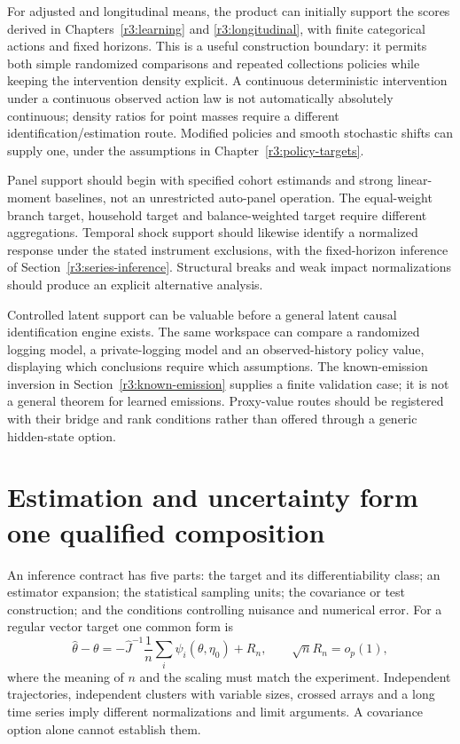 For adjusted and longitudinal means, the product can initially support
the scores derived in Chapters~\ref{r3:learning} and \ref{r3:longitudinal},
with finite categorical actions and fixed horizons. This is a useful
construction boundary: it permits both simple randomized comparisons and
repeated collections policies while keeping the intervention density
explicit. A continuous deterministic intervention under a continuous
observed action law is not automatically absolutely continuous; density
ratios for point masses require a different identification/estimation
route. Modified policies and smooth stochastic shifts can supply one,
under the assumptions in Chapter~\ref{r3:policy-targets}.

Panel support should begin with specified cohort estimands and strong
linear-moment baselines, not an unrestricted auto-panel operation.
The equal-weight branch target, household target and balance-weighted
target require different aggregations. Temporal shock support should
likewise identify a normalized response under the stated instrument
exclusions, with the fixed-horizon inference of
Section~\ref{r3:series-inference}. Structural breaks and weak impact
normalizations should produce an explicit alternative analysis.

Controlled latent support can be valuable before a general latent causal
identification engine exists. The same workspace can compare a randomized
logging model, a private-logging model and an observed-history policy
value, displaying which conclusions require which assumptions. The
known-emission inversion in Section~\ref{r3:known-emission} supplies a
finite validation case; it is not a general theorem for learned emissions.
Proxy-value routes should be registered with their bridge and rank
conditions rather than offered through a generic hidden-state option.

\section{Estimation and uncertainty form one qualified composition}
\label{r3:inference-contract}

An inference contract has five parts: the target and its differentiability
class; an estimator expansion; the statistical sampling units; the
covariance or test construction; and the conditions controlling nuisance
and numerical error. For a regular vector target one common form is
\[
 \widehat\theta-\theta
 =-\widehat J^{-1}\frac1n\sum_i\psi_i(\theta,\eta_0)
   +R_n,\qquad \sqrt n R_n=o_p(1),
\]
where the meaning of $n$ and the scaling must match the experiment.
Independent trajectories, independent clusters with variable sizes,
crossed arrays and a long time series imply different normalizations
and limit arguments. A covariance option alone cannot establish them.

